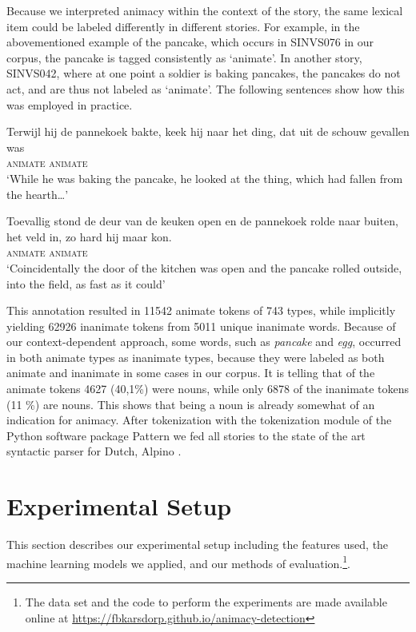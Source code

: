 \documentclass[a4paper,UKenglish]{oasics}
\begin{document}
Because we interpreted animacy within the context of the story, the
same lexical item could be labeled differently in different stories.
For example, in the abovementioned example of the pancake, which
occurs in SINVS076 in our corpus, the pancake is tagged consistently
as `animate'. In another story, SINVS042, where at one point a soldier
is baking pancakes, the pancakes do not act, and are thus not labeled
as `animate'. The following sentences show how this was employed in
practice.
\begin{exe}
\ex
\gll Terwijl hij de pannekoek bakte, keek hij naar het ding, dat uit de schouw gevallen was \\
    {} \textsc{animate} {} {} {} {} \textsc{animate} {} {} {} {} {} {} {} {} {} {}\\
\trans `While he was baking the pancake, he looked at the thing, which had fallen from the hearth\ldots'
\end{exe}
\begin{exe}
\ex
\gll Toevallig stond de deur van de keuken open en de pannekoek rolde naar buiten, het veld in, zo hard hij maar kon.\\
    {} {} {} {} {} {} {} {} {} {} \textsc{animate} {} {} {} {} {} {} {} {} {}\textsc{animate} {} {} \\
\trans `Coincidentally the door of the kitchen was open and the pancake rolled outside, into the field, as fast as it could'
\end{exe}

This annotation resulted in 11542 animate tokens of 743 types, while
implicitly yielding 62926 inanimate tokens from 5011 unique inanimate
words. Because of our context-dependent approach, some words, such as
\textit{pancake} and \textit{egg}, occurred in both animate types as
inanimate types, because they were labeled as both animate and
inanimate in some cases in our corpus. It is telling that of the
animate tokens 4627 (40,1\%) were nouns, while only 6878 of the
inanimate tokens (11 \%) are nouns. This shows that being a noun is
already somewhat of an indication for animacy.
After tokenization with the tokenization module of the Python software
package Pattern \cite{smedt:12} we fed all stories to the
state of the art syntactic parser for Dutch, Alpino \cite{bouma:01}.

\section{Experimental Setup}\label{sec:models}
This section describes our experimental setup including the features
used, the machine learning models we applied, and our methods of
evaluation.\footnote{The data set and the code to perform the
  experiments are made available online at
  \url{https://fbkarsdorp.github.io/animacy-detection}}.
\end{document}
